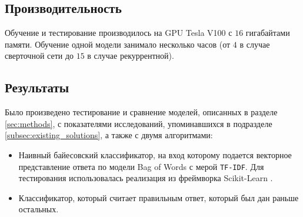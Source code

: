 \documentclass[../diploma.tex]{subfiles}
\begin{document}
	\subsection{Производительность}

	Обучение и тестирование производилось на GPU Tesla V100 с $16$ гигабайтами памяти.
	Обучение одной модели занимало несколько часов (от $4$ в случае сверточной сети до $15$ в случае рекуррентной).

	\subsection{Результаты}
		
	Было произведено тестирование и сравнение моделей, описанных в разделе \ref{sec:methods}, 
	с показателями исследований, упоминавшихся в подразделе \ref{subsec:existing_solutions},
	а также с двумя алгоритмами:

	\begin{itemize}
	
		\item
		Наивный байесовский классификатор, на вход которому подается векторное представление ответа по модели Bag of Words с мерой \texttt{TF-IDF}.
		Для тестирования использовалась реализация из фреймворка Scikit-Learn \cite{online:scikit_learn}.

	    \item
	    Классификатор, который считает правильным ответ, который был дан раньше остальных.

	\end{itemize}
\end{document}
